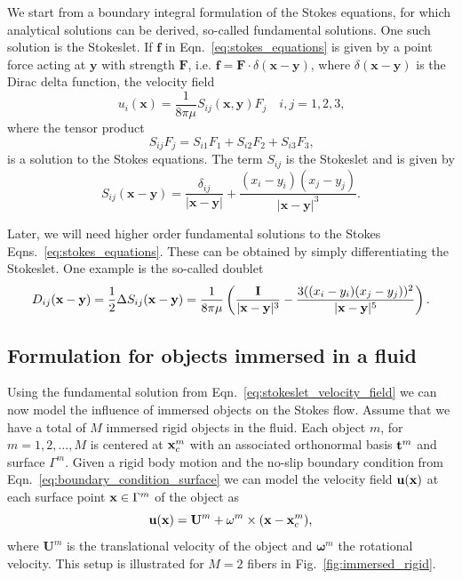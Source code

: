 We start from a boundary integral formulation of the Stokes equations, for which analytical solutions can be derived, so-called fundamental solutions. One such solution is the Stokeslet. If $\mathbf{f}$ in Eqn.~\eqref{eq:stokes_equations} is given by a point force acting at $\mathbf{y}$ with strength $\mathbf{F}$, i.e. $\mathbf{f} = \mathbf{F} \cdot \delta(\mathbf{x} - \mathbf{y})$, where $\delta(\mathbf{x} - \mathbf{y})$ is the Dirac delta function, the velocity field
\begin{equation}
  \label{eq:stokeslet_velocity_field}
  u_i(\mathbf{x}) = \frac{1}{8\pi\mu}S_{ij}(\mathbf{x},\mathbf{y})F_j \quad i,j=1,2,3 \text{,}
\end{equation}
where the tensor product
\begin{equation}
  \label{eq:stokeslet_tensor_product}
  S_{ij}F_j = S_{i1}F_1 + S_{i2}F_2 + S_{i3}F_3 \text{,}
\end{equation}
is a solution to the Stokes equations. The term $S_{ij}$ is the Stokeslet and is given by
\begin{equation}
  \label{eq:stokeslet_stokeslet}
  S_{ij}(\mathbf{x} - \mathbf{y}) = \frac{\delta_{ij}}{|\mathbf{x}-\mathbf{y}|} + \frac{(x_i - y_i)(x_j-y_j)}{|\mathbf{x}-\mathbf{y}|^3}\text{.}
\end{equation}

Later, we will need higher order fundamental solutions to the Stokes Eqns.~\eqref{eq:stokes_equations}. These can be obtained by simply differentiating the Stokeslet. One example is the so-called doublet
\begin{equation}
  \label{eq:doublet}
  D_{ij}(\mathbf{x} - \mathbf{y}) = \frac{1}{2} \Delta S_{ij}(\mathbf{x} - \mathbf{y}) = \frac{1}{8\pi\mu} \left( \frac{\mathbf{I}}{|\mathbf{x} - \mathbf{y}|^3} - \frac{3((x_i - y_i)(x_j-y_j))^2}{|\mathbf{x} - \mathbf{y}|^5}\right) \text{.}
\end{equation}

\subsection{Formulation for objects immersed in a fluid}
\label{subsec:formulation_objects_in_fluid}

Using the fundamental solution from Eqn.~\eqref{eq:stokeslet_velocity_field} we can now model the influence of immersed objects on the Stokes flow. Assume that we have a total of $M$ immersed rigid objects in the fluid. Each object $m$, for $m = 1,2,\dots,M$ is centered at $\mathbf{x}_c^m$ with an associated orthonormal basis $\mathbf{t}^m$ and surface $\Gamma^m$. Given a rigid body motion and the no-slip boundary condition from Eqn.~\eqref{eq:boundary_condition_surface} we can model the velocity field $\mathbf{u}(\mathbf{x})$ at each surface point $\mathbf{x} \in \Gamma^m$ of the object as
\begin{equation}
  \label{eq:rigid_body_motion}
	\mathbf{u}(\mathbf{x}) = \mathbf{U}^m + \mathbf{\omega}^m \times (\mathbf{x} - \mathbf{x}_c^m) \text{,}
\end{equation}
where $\mathbf{U}^m$ is the translational velocity of the object and $\mathbf{\omega}^m$ the rotational velocity. This setup is illustrated for $M=2$ fibers in Fig.~\ref{fig:immersed_rigid}.

